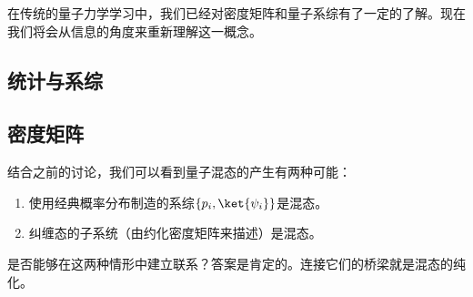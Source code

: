 
\begin{issues}
\issueDraft
\issueTODO
\end{issues}



在传统的量子力学学习中，我们已经对密度矩阵和量子系综有了一定的了解。现在我们将会从信息的角度来重新理解这一概念。

\subsection{统计与系综}

\subsection{密度矩阵}

结合之前的讨论，我们可以看到量子混态的产生有两种可能：\begin{enumerate}
\item 使用经典概率分布制造的系综$\{p_i,\ket{\psi_i}\}$是混态。
\item 纠缠态的子系统（由约化密度矩阵来描述）是混态。
\end{enumerate}

是否能够在这两种情形中建立联系？答案是肯定的。连接它们的桥梁就是混态的纯化。